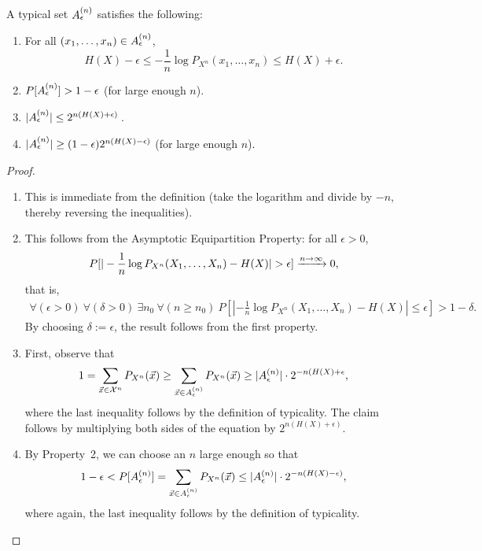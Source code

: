 \begin{proposition}\label{prop:typset-properties}
A typical set $A_{\epsilon}^{(n)}$ satisfies the following:
\begin{enumerate}
\item For all $(x_1, \ldots, x_n) \in A_{\epsilon}^{(n)}$, \[H(X) - \epsilon \leq - \frac{1}{n} \log P_{X^n}(x_1, \ldots, x_n) \leq H(X) + \epsilon.\]
\item $P[A_{\epsilon}^{(n)}] > 1 - \epsilon$ (for large enough $n$).
\item $|A_{\epsilon}^{(n)}| \leq 2^{n(H(X) + \epsilon)} \,$.
\item $|A_{\epsilon}^{(n)}| \geq (1-\epsilon) 2^{n(H(X) - \epsilon)}$ (for large enough $n$).
\end{enumerate}
\end{proposition}
\begin{proof}\ 
\begin{enumerate}
\item This is immediate from the definition (take the logarithm and
  divide by $-n$, thereby reversing the inequalities).
\item This follows from the Asymptotic Equipartition Property: for all $\epsilon > 0$,
\begin{align}P[|-\frac{1}{n} \log P_{X^n}(X_1, \ldots, X_n) - H(X)| > \epsilon] \xrightarrow{n \to \infty} 0,\end{align}
 that is,
\begin{align}\forall (\epsilon > 0) \ \forall (\delta > 0) \ \exists n_0 \ \forall (n \geq n_0) \ P[|-\frac{1}{n} \log P_{X^n}(X_1, \ldots, X_n) - H(X)| \leq \epsilon] > 1 - \delta.
\end{align}
By choosing $\delta := \epsilon$, the result follows from the first property.
\item First, observe that
\begin{align}
1 = \sum_{\vec{x} \in \mathcal{X}^n} P_{X^n}(\vec{x}) \geq \sum_{\vec{x} \in A_{\epsilon}^{(n)}} P_{X^n}(\vec{x}) \geq |A_{\epsilon}^{(n)}| \cdot 2^{-n(H(X) + \epsilon},
\end{align}
where the last inequality follows by the definition of typicality. The claim follows by multiplying both sides of the equation by $2^{n(H(X) + \epsilon)}$.
\item By Property~2, we can choose an $n$ large enough so that
\begin{align}
1 - \epsilon < P[A_{\epsilon}^{(n)}] = \sum_{\vec{x} \in A_{\epsilon}^{(n)}} P_{X^n}(\vec{x}) \leq |A_{\epsilon}^{(n)}| \cdot 2^{-n(H(X)-\epsilon)},
\end{align}
where again, the last inequality follows by the definition of typicality.
\end{enumerate}
\end{proof}



